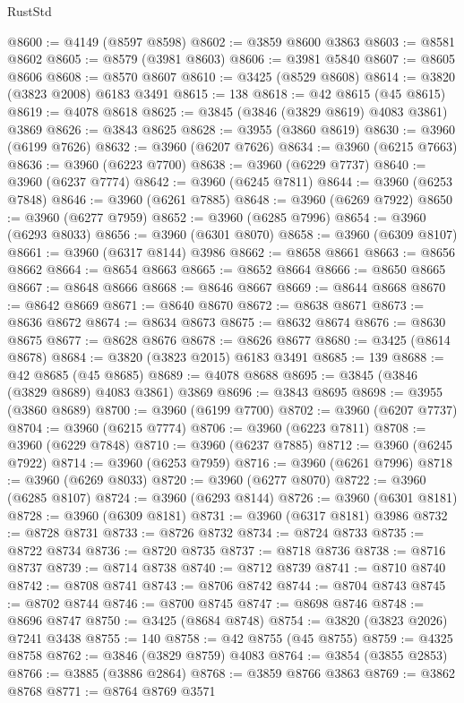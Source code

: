 \begin{lexlean}{RustStd}
\begin{coremodule}
@8600 := @4149 (@8597 @8598)
@8602 := @3859 @8600 @3863
@8603 := @8581 @8602
@8605 := @8579 (@3981 @8603)
@8606 := @3981 @5840
@8607 := @8605 @8606
@8608 := @8570 @8607
@8610 := @3425 (@8529 @8608)
@8614 := @3820 (@3823 @2008) @6183 @3491
@8615 := 138
@8618 := @42 @8615 (@45 @8615)
@8619 := @4078 @8618
@8625 := @3845 (@3846 (@3829 @8619) @4083 @3861) @3869
@8626 := @3843 @8625
@8628 := @3955 (@3860 @8619)
@8630 := @3960 (@6199 @7626)
@8632 := @3960 (@6207 @7626)
@8634 := @3960 (@6215 @7663)
@8636 := @3960 (@6223 @7700)
@8638 := @3960 (@6229 @7737)
@8640 := @3960 (@6237 @7774)
@8642 := @3960 (@6245 @7811)
@8644 := @3960 (@6253 @7848)
@8646 := @3960 (@6261 @7885)
@8648 := @3960 (@6269 @7922)
@8650 := @3960 (@6277 @7959)
@8652 := @3960 (@6285 @7996)
@8654 := @3960 (@6293 @8033)
@8656 := @3960 (@6301 @8070)
@8658 := @3960 (@6309 @8107)
@8661 := @3960 (@6317 @8144) @3986
@8662 := @8658 @8661
@8663 := @8656 @8662
@8664 := @8654 @8663
@8665 := @8652 @8664
@8666 := @8650 @8665
@8667 := @8648 @8666
@8668 := @8646 @8667
@8669 := @8644 @8668
@8670 := @8642 @8669
@8671 := @8640 @8670
@8672 := @8638 @8671
@8673 := @8636 @8672
@8674 := @8634 @8673
@8675 := @8632 @8674
@8676 := @8630 @8675
@8677 := @8628 @8676
@8678 := @8626 @8677
@8680 := @3425 (@8614 @8678)
@8684 := @3820 (@3823 @2015) @6183 @3491
@8685 := 139
@8688 := @42 @8685 (@45 @8685)
@8689 := @4078 @8688
@8695 := @3845 (@3846 (@3829 @8689) @4083 @3861) @3869
@8696 := @3843 @8695
@8698 := @3955 (@3860 @8689)
@8700 := @3960 (@6199 @7700)
@8702 := @3960 (@6207 @7737)
@8704 := @3960 (@6215 @7774)
@8706 := @3960 (@6223 @7811)
@8708 := @3960 (@6229 @7848)
@8710 := @3960 (@6237 @7885)
@8712 := @3960 (@6245 @7922)
@8714 := @3960 (@6253 @7959)
@8716 := @3960 (@6261 @7996)
@8718 := @3960 (@6269 @8033)
@8720 := @3960 (@6277 @8070)
@8722 := @3960 (@6285 @8107)
@8724 := @3960 (@6293 @8144)
@8726 := @3960 (@6301 @8181)
@8728 := @3960 (@6309 @8181)
@8731 := @3960 (@6317 @8181) @3986
@8732 := @8728 @8731
@8733 := @8726 @8732
@8734 := @8724 @8733
@8735 := @8722 @8734
@8736 := @8720 @8735
@8737 := @8718 @8736
@8738 := @8716 @8737
@8739 := @8714 @8738
@8740 := @8712 @8739
@8741 := @8710 @8740
@8742 := @8708 @8741
@8743 := @8706 @8742
@8744 := @8704 @8743
@8745 := @8702 @8744
@8746 := @8700 @8745
@8747 := @8698 @8746
@8748 := @8696 @8747
@8750 := @3425 (@8684 @8748)
@8754 := @3820 (@3823 @2026) @7241 @3438
@8755 := 140
@8758 := @42 @8755 (@45 @8755)
@8759 := @4325 @8758
@8762 := @3846 (@3829 @8759) @4083
@8764 := @3854 (@3855 @2853)
@8766 := @3885 (@3886 @2864)
@8768 := @3859 @8766 @3863
@8769 := @3862 @8768
@8771 := @8764 @8769 @3571

\end{coremodule}
\end{lexlean}
